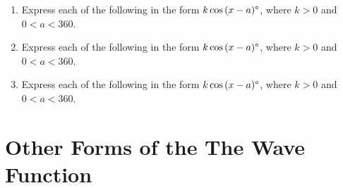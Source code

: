 \documentclass[
  11pt,
  openany]{book}
\begin{document}
\vspace{-0.3cm}

\begin{enumerate}
    \item Express each of the following in the form $k\cos{(x-a)}\degree$, where $k>0$ and $0<a<360$. \faCalculator
    \vspace{-0.2cm}
    \begin{enumerate}
    \end{enumerate}
    \item Express each of the following in the form $k\cos{(x-a)}\degree$, where $k>0$ and $0<a<360$. \faCalculator
    \vspace{-0.2cm}
    \begin{enumerate}
    \end{enumerate}
    \item Express each of the following in the form $k\cos{(x-a)}\degree$, where $k>0$ and $0<a<360$.
    \vspace{-0.2cm}
    \begin{enumerate}
    \end{enumerate}
\end{enumerate}

\pagebreak

\section{Other Forms of the The Wave Function}\label{other-forms-of-the-the-wave-function}
\end{document}
